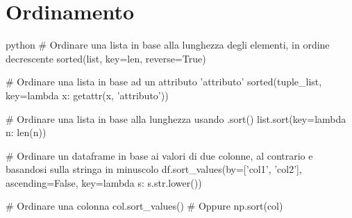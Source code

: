 \documentclass[11pt]{report}
\begin{document}
\section{Ordinamento}
\begin{mintedbox}{python}
# Ordinare una lista in base alla lunghezza degli elementi, in ordine decrescente
sorted(list, key=len, reverse=True)

# Ordinare una lista in base ad un attributo 'attributo'
sorted(tuple_list, key=lambda x: getattr(x, 'attributo'))

# Ordinare una lista in base alla lunghezza usando .sort()
list.sort(key=lambda n: len(n))

# Ordinare un dataframe in base ai valori di due colonne, al contrario e basandosi sulla stringa in minuscolo
df.sort_values(by=['col1', 'col2'], ascending=False, key=lambda s: s.str.lower())

# Ordinare una colonna
col.sort_values()
# Oppure
np.sort(col)
\end{mintedbox}
\end{document}
